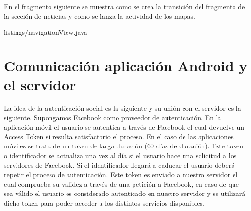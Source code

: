 En el fragmento siguiente se muestra como se crea la transición del fragmento de la sección de noticias y como se lanza la actividad de los mapas.


{listings/navigationView.java} %

\section{Comunicación aplicación Android y el servidor}
La idea de la autenticación social es la siguiente y su unión con el servidor es 
la siguiente. Supongamos Facebook como proveedor de autenticación. En la aplicación 
móvil el usuario se autentica a través de Facebook el cual devuelve un Access Token
si resulta satisfactorio el proceso. En el caso de las aplicaciones móviles se trata 
de un token de larga duración (60 días de duración). Este token o identificador 
se actualiza una vez al día si el usuario hace una solicitud a los servidores de 
Facebook. Si el identificador llegará a caducar el usuario deberá repetir el proceso
de autenticación. Este token es enviado a nuestro servidor el cual comprueba su validez
a través de una petición a Facebook, en caso de que sea válido el usuario es considerado
autenticado en nuestro servidor y se utilizará dicho token para poder acceder a los 
distintos servicios disponibles.
